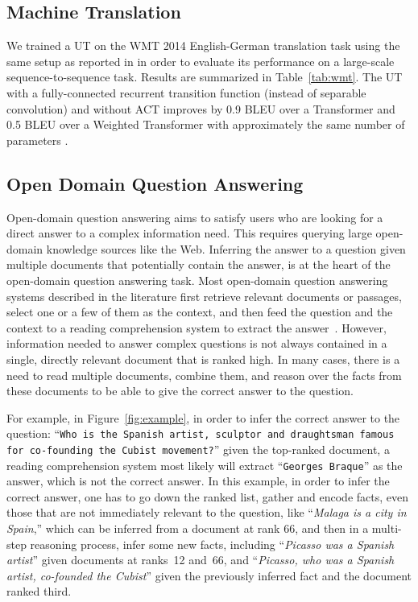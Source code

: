 \subsection{Machine Translation}
We trained a UT on the WMT 2014 English-German translation task using the same setup as reported in \citep{transformer} in order to evaluate its performance on a large-scale sequence-to-sequence task. Results are summarized in Table~\ref{tab:wmt}. The UT with a fully-connected recurrent transition function (instead of separable convolution) and without ACT improves by 0.9 BLEU over a Transformer and 0.5 BLEU over a Weighted Transformer with approximately the same number of parameters \citep{ahmed2017weighted}.



\subsection{Open Domain Question Answering}
Open-domain question answering aims to satisfy users who are looking for a direct answer to a complex information need. 
This requires querying large open-domain knowledge sources like the Web. 
Inferring the answer to a question given multiple documents that potentially contain the answer, is at the heart of the open-domain question answering task. 
Most open-domain question answering systems described in the literature first retrieve relevant documents or passages, select one or a few of them as the context, and then feed the question and the context to a reading comprehension system to extract the answer~\citep{buck2017ask, chen2017reading, seo2016bidirectional, dhingra2016gated}. 
However, information needed to answer complex questions is not always contained in a single, directly relevant document that is ranked high. In many cases, there is a need to read multiple documents, combine them, and reason over the facts from these documents to be able to give the correct answer to the question.

For example, in Figure~\ref{fig:example}, in order to infer the correct answer to the question: ``\texttt{Who is the Spanish artist, sculptor and draughtsman famous for co-founding the Cubist movement?}'' given the top-ranked document, a reading comprehension system most likely will extract ``\texttt{Georges Braque}'' as the answer, which is not the correct answer. 
In this example, in order to infer the correct answer, one has to go down the ranked list, gather and encode facts, even those that are not immediately relevant to the question, like ``\emph{Malaga is a city in Spain},'' which can be inferred from a document at rank 66, and then in a multi-step reasoning process, infer some new facts, including ``\emph{Picasso was a Spanish artist}'' given documents at ranks~12 and~66, and ``\emph{Picasso, who was a Spanish artist, co-founded the Cubist}'' given the previously inferred fact and the document ranked third. 

